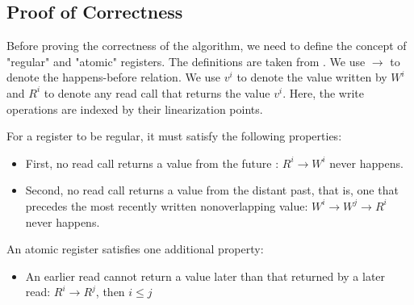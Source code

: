 \subsection{Proof of Correctness}

Before proving the correctness of the algorithm, we need to define the concept of "regular" and "atomic" registers. The definitions are taken from \cite{aomp}. We use $\rightarrow$ to denote the happens-before relation. We use $v^i$ to denote the value written by $W^i$ and $R^i$ to denote any read call that returns the value $v^i$. Here, the write operations are indexed by their linearization points.


\begin{definition}
For a register to be regular, it must satisfy the following properties:
    \begin{itemize}
        \item First, no read call returns a value from the future : $R^i \rightarrow W^i$ never happens.
        \item Second, no read call returns a value from the distant past, that is, one that precedes the most recently written nonoverlapping value: $W^i \rightarrow W^j \rightarrow R^i$ never happens.
    \end{itemize}
\label{def:regular}
\end{definition}

\begin{definition}
An atomic register satisfies one additional property:
    \begin{itemize}
        \item An earlier read cannot return a value later than that returned by a later read: $R^i \rightarrow R^j$, then $i \leq j$
    \end{itemize}
    \label{def:atomic}
\end{definition}


